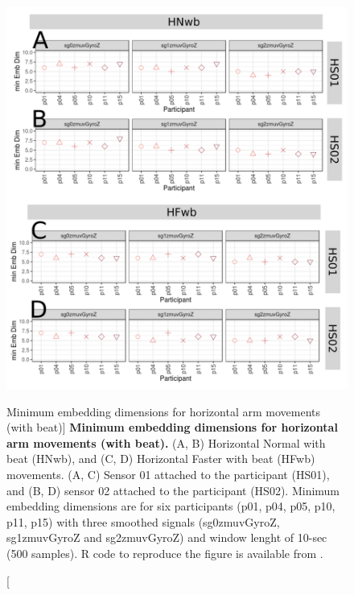 \begin{figure}
\centering
\includegraphics[width=1.0\textwidth]{cao_Hwb_w10}
	\caption
	[Minimum embedding dimensions for horizontal arm movements 
	(with beat)]{
	{\bf Minimum embedding dimensions for horizontal arm movements 
	(with beat).} 
		(A, B) Horizontal Normal with beat (HNwb), and
		(C, D) Horizontal Faster with beat (HFwb) movements.
		(A, C) Sensor 01 attached to the participant (HS01), and
		(B, D) sensor 02 attached to the participant (HS02).
		Minimum embedding dimensions are for six participants 
		(p01, p04, p05, p10, p11, p15) with three smoothed signals 
		(sg0zmuvGyroZ, sg1zmuvGyroZ and sg2zmuvGyroZ)
		and window lenght of 10-sec (500 samples).
		R code to reproduce the figure is available 
		from \cite{hwum2018}.
        }
    \label{fig:caoHwb}
\end{figure}


